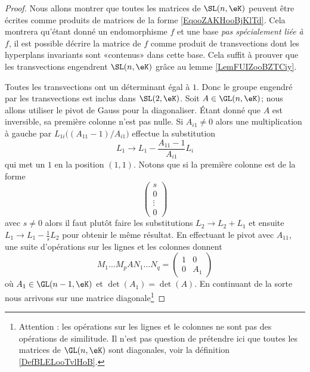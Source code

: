 \begin{proof}
    Nous allons montrer que toutes les matrices de \( \SL(n,\eK)\) peuvent être écrites comme produits de matrices de la forme \eqref{EqooZAKHooBjKlTd}. Cela montrera qu'étant donné un endomorphisme \( f\) et une base \emph{pas spécialement liée à \( f\)}, il est possible décrire la matrice de \( f\) comme produit de transvections dont les hyperplans invariants sont «contenus» dans cette base. Cela suffit à prouver que les transvections engendrent \( \SL(n,\eK)\) grâce au lemme \ref{LemFUIZooBZTCiy}.

    Toutes les transvections ont un déterminant égal à \( 1\). Donc le groupe engendré par les transvections est inclus dans \( \SL(2,\eK)\). Soit \( A\in\GL(n,\eK)\); nous allons utiliser le pivot de Gauss pour la diagonaliser. Étant donné que \( A\) est inversible, sa première colonne n'est pas nulle. Si \( A_{i1}\neq 0\) alors une multiplication à gauche par \( L_{1i}\big(   (A_{11}-1)/A_{i1}  \big)\) effectue la substitution
    \begin{equation}
        L_1\to L_1-\frac{ A_{11}-1 }{ A_{i1} }L_i
    \end{equation}
    qui met un \( 1\) en la position \( (1,1)\). Notons que si la première colonne est de la forme 
    \begin{equation}
        \begin{pmatrix}
            s    \\ 
            0    \\ 
            \vdots    \\ 
            0    
        \end{pmatrix}
    \end{equation}
    avec \( s\neq 0\) alors il faut plutôt faire les substitutions \( L_2\to L_2+L_1\) et ensuite \( L_1\to L_1-\frac{1}{ s }L_2\) pour obtenir le même résultat. En effectuant le pivot avec \( A_{11}\), une suite d'opérations sur les lignes et les colonnes donnent
    \begin{equation}
        M_1\ldots M_pAN_1\ldots N_q=\begin{pmatrix}
            1    &   0    \\ 
            0    &   A_1    
        \end{pmatrix}
    \end{equation}
    où \( A_1\in\GL(n-1,\eK)\) et \( \det(A_1)=\det(A)\). En continuant de la sorte nous arrivons sur une matrice diagonale\footnote{Attention : les opérations sur les lignes et le colonnes ne sont pas des opérations de similitude. Il n'est pas question de prétendre ici que toutes les matrices de \( \GL(n,\eK)\) sont diagonales, voir la définition \ref{DefBLELooTvlHoB}.}

\end{proof}
